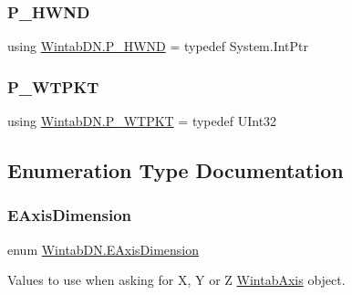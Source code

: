 \subsubsection{\texorpdfstring{P\+\_\+\+H\+W\+ND}{P\_HWND}}
{\footnotesize\ttfamily using \mbox{\hyperlink{namespace_wintab_d_n_a33ba63b3dc16db27638a5f294140f53a}{Wintab\+D\+N.\+P\+\_\+\+H\+W\+ND}} = typedef System.\+Int\+Ptr}

\mbox{\label{namespace_wintab_d_n_a465f8a123fa56040cd62f6a4df2707aa}} 
\subsubsection{\texorpdfstring{P\+\_\+\+W\+T\+P\+KT}{P\_WTPKT}}
{\footnotesize\ttfamily using \mbox{\hyperlink{namespace_wintab_d_n_a465f8a123fa56040cd62f6a4df2707aa}{Wintab\+D\+N.\+P\+\_\+\+W\+T\+P\+KT}} = typedef U\+Int32}



\subsection{Enumeration Type Documentation}
\mbox{\label{namespace_wintab_d_n_a38705aa38c49c04846399172fa9fd1cd}} 
\subsubsection{\texorpdfstring{E\+Axis\+Dimension}{EAxisDimension}}
{\footnotesize\ttfamily enum \mbox{\hyperlink{namespace_wintab_d_n_a38705aa38c49c04846399172fa9fd1cd}{Wintab\+D\+N.\+E\+Axis\+Dimension}}\hspace{0.3cm}{\ttfamily [strong]}}



Values to use when asking for X, Y or Z \mbox{\hyperlink{struct_wintab_d_n_1_1_wintab_axis}{Wintab\+Axis}} object. 

